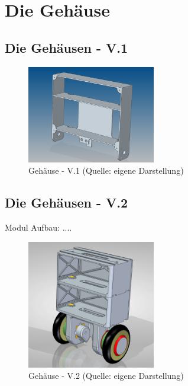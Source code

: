 \renewcommand{\autoren}{Valentyn Chepil, Alexsander Stoiljkovic}
\newpage
\section{Die Gehäuse}
\subsection{Die Gehäusen - V.1}

\begin{figure}[!h]  %
	\centering\includegraphics[width=0.5\textwidth]{images/gehaeuse-v1.png}
	\caption{Gehäuse - V.1 \newline (Quelle: eigene Darstellung)}
	\label{gehaeuse-v1} %
\end{figure}

\subsection{Die Gehäusen - V.2}
Modul Aufbau: ....

\begin{figure}[!h]  %
	\centering\includegraphics[width=0.5\textwidth]{images/gehaeuse-v2.png}
	\caption{Gehäuse - V.2 \newline (Quelle: eigene Darstellung)}
	\label{gehaeuse-v2} %
\end{figure}


